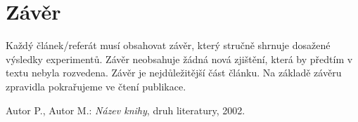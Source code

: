 \documentclass[journal]{IEEEtrancz}
\begin{document}
\section{Závěr}
Každý článek/referát musí obsahovat závěr, který stručně shrnuje dosažené výsledky 
experimentů. Závěr neobsahuje žádná nová zjištění, která by předtím v textu nebyla rozvedena.
Závěr je nejdůležitější část článku. Na základě závěru zpravidla pokrařujeme ve čtení
publikace. 


\begin{literatura}{1}

Autor P., Autor M.: \emph{Název knihy}, druh literatury, 2002.

\end{literatura}
\end{document}
